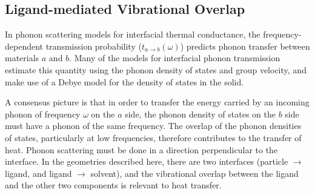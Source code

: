 \subsection{Ligand-mediated Vibrational Overlap}

In phonon scattering models for interfacial thermal
conductance,\cite{Swartz:1989uq,Young:1989xy,Cahill:2003fk,Reddy:2005fk,Schmidt:2010nr}
the frequency-dependent transmission probability
($t_{a \rightarrow b}(\omega)$) predicts phonon transfer between
materials $a$ and $b$.  Many of the models for interfacial phonon
transmission estimate this quantity using the phonon density of states
and group velocity, and make use of a Debye model for the density of
states in the solid.

A consensus picture is that in order to transfer the energy carried by
an incoming phonon of frequency $\omega$ on the $a$ side, the phonon
density of states on the $b$ side must have a phonon of the same
frequency. The overlap of the phonon densities of states, particularly
at low frequencies, therefore contributes to the transfer of heat.
Phonon scattering must be done in a direction perpendicular to
the interface.  In the geometries described here, there are two
interfaces (particle $\rightarrow$ ligand, and ligand $\rightarrow$
solvent), and the vibrational overlap between the ligand and the other
two components is relevant to heat transfer.
 
